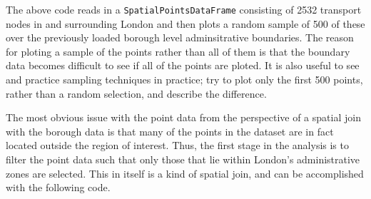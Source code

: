 \documentclass[]{article}
\begin{document}
The above code reads in a \texttt{SpatialPointsDataFrame} consisting of
2532 transport nodes in and surrounding London and then plots a random
sample of 500 of these over the previously loaded borough level
adminsitrative boundaries. The reason for ploting a sample of the points
rather than all of them is that the boundary data becomes difficult to
see if all of the points are ploted. It is also useful to see and
practice sampling techniques in practice; try to plot only the first 500
points, rather than a random selection, and describe the difference.

The most obvious issue with the point data from the perspective of a
spatial join with the borough data is that many of the points in the
dataset are in fact located outside the region of interest. Thus, the
first stage in the analysis is to filter the point data such that only
those that lie within London's administrative zones are selected. This
in itself is a kind of spatial join, and can be accomplished with the
following code.
\end{document}
